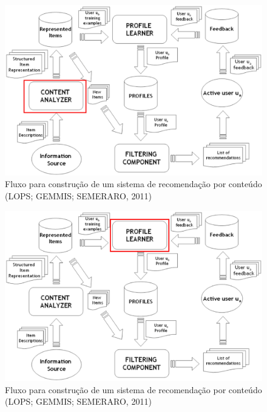 \begin{frame}

\begin{figure}[h!]
  \centering
    \includegraphics[width=1\textwidth]{figura/recomendacao_conteudo_2.eps}
  \caption{Fluxo para construção de um sistema de recomendação por conteúdo (LOPS; GEMMIS; SEMERARO, 2011)}
\end{figure}

\end{frame}

\begin{frame}

\begin{figure}[h!]
  \centering
    \includegraphics[width=1\textwidth]{figura/recomendacao_conteudo_3.eps}
  \caption{Fluxo para construção de um sistema de recomendação por conteúdo (LOPS; GEMMIS; SEMERARO, 2011)}
\end{figure}

\end{frame}

